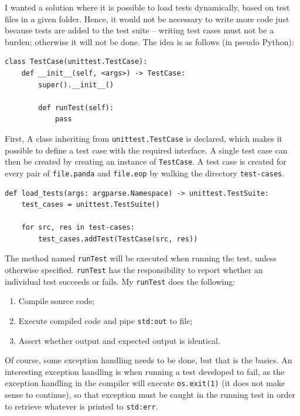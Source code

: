 I wanted a solution where it is possible to load tests dynamically, based on test files in a given folder. Hence, it would not be necessary to write more code just because tests are added to the test suite -- writing test cases must not be a burden; otherwise it will not be done. The idea is as follows (in pseudo Python):

\begin{verbatim}
class TestCase(unittest.TestCase):
    def __init__(self, <args>) -> TestCase:
        super().__init__()

        def runTest(self):
            pass
\end{verbatim}

First, A class inheriting from \texttt{unittest.TestCase} is declared, which makes it possible to define a test case with the required interface. A single test case can then be created by creating an instance of \texttt{TestCase}. A test case is created for every pair of \texttt{file.panda} and \texttt{file.eop} by walking the directory \texttt{test-cases}.

\begin{verbatim}
def load_tests(args: argparse.Namespace) -> unittest.TestSuite:
    test_cases = unittest.TestSuite()

    for src, res in test-cases:
        test_cases.addTest(TestCase(src, res))
\end{verbatim}

The method named \texttt{runTest} will be executed when running the test, unless otherwise specified. \texttt{runTest} has the responsibility to report whether an individual test succeeds or fails. My \texttt{runTest} does the following:

\begin{enumerate}
    \item Compile source code;
    \item Execute compiled code and pipe \texttt{std:out} to file;
    \item Assert whether output and expected output is identical.
\end{enumerate}

Of course, some exception handling needs to be done, but that is the basics. An interesting exception handling is when running a test developed to fail, as the exception handling in the compiler will execute \texttt{os.exit(1)} (it does not make sense to continue), so that exception must be caught in the running test in order to retrieve whatever is printed to \texttt{std:err}.

